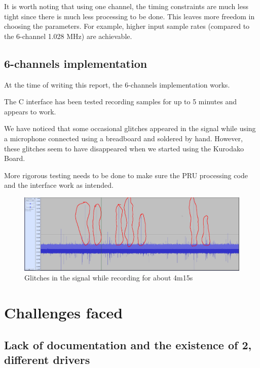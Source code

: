 \documentclass[]{report}
\begin{document}
It is worth noting that using one channel, the timing constraints are much less tight since there is much less processing to be done. This leaves more freedom in choosing the parameters. For example, higher input sample rates (compared to the 6-channel 1.028 MHz) are achievable.

\hypertarget{channels-implementation}{%
\section{6-channels implementation}\label{channels-implementation}}

At the time of writing this report, the 6-channels implementation works.

The C interface has been tested recording samples for up to 5 minutes and appears to work.

We have noticed that some occasional glitches appeared in the signal while using a microphone connected using a breadboard and soldered by hand. However, these glitches seem to have disappeared when we started using the Kurodako Board.

More rigorous testing needs to be done to make sure the PRU processing code and the interface work as intended.

\begin{figure}[H]
\centering
\includegraphics[width=0.8\linewidth]{Pictures/glitches_circled.png}
\caption{Glitches in the signal while recording for about 4m15s}
\end{figure}

\hypertarget{challenges-faced}{%
\chapter{Challenges faced}\label{challenges-faced}}

\hypertarget{lack-of-documentation-and-the-existence-of-2-different-drivers}{%
\section{Lack of documentation and the existence of 2, different
drivers}\label{lack-of-documentation-and-the-existence-of-2-different-drivers}}
\end{document}
